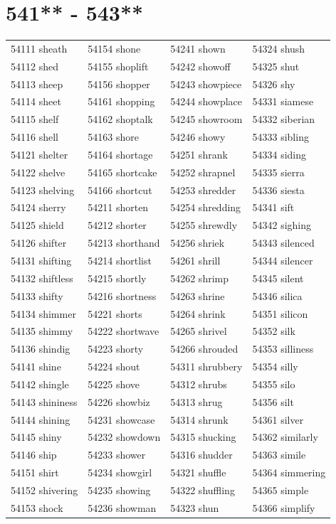 \documentclass[10pt, oneside]{book}
\begin{document}
\begin{table}
	\centering
	\section*{541** - 543**}
	\begin{tabular}{l l l l}
54111 sheath &54154 shone &54241 shown &54324 shush\\
54112 shed &54155 shoplift &54242 showoff &54325 shut\\
54113 sheep &54156 shopper &54243 showpiece &54326 shy\\
54114 sheet &54161 shopping &54244 showplace &54331 siamese\\
54115 shelf &54162 shoptalk &54245 showroom &54332 siberian\\
54116 shell &54163 shore &54246 showy &54333 sibling\\
54121 shelter &54164 shortage &54251 shrank &54334 siding\\
54122 shelve &54165 shortcake &54252 shrapnel &54335 sierra\\
54123 shelving &54166 shortcut &54253 shredder &54336 siesta\\
54124 sherry &54211 shorten &54254 shredding &54341 sift\\
54125 shield &54212 shorter &54255 shrewdly &54342 sighing\\
54126 shifter &54213 shorthand &54256 shriek &54343 silenced\\
54131 shifting &54214 shortlist &54261 shrill &54344 silencer\\
54132 shiftless &54215 shortly &54262 shrimp &54345 silent\\
54133 shifty &54216 shortness &54263 shrine &54346 silica\\
54134 shimmer &54221 shorts &54264 shrink &54351 silicon\\
54135 shimmy &54222 shortwave &54265 shrivel &54352 silk\\
54136 shindig &54223 shorty &54266 shrouded &54353 silliness\\
54141 shine &54224 shout &54311 shrubbery &54354 silly\\
54142 shingle &54225 shove &54312 shrubs &54355 silo\\
54143 shininess &54226 showbiz &54313 shrug &54356 silt\\
54144 shining &54231 showcase &54314 shrunk &54361 silver\\
54145 shiny &54232 showdown &54315 shucking &54362 similarly\\
54146 ship &54233 shower &54316 shudder &54363 simile\\
54151 shirt &54234 showgirl &54321 shuffle &54364 simmering\\
54152 shivering &54235 showing &54322 shuffling &54365 simple\\
54153 shock &54236 showman &54323 shun &54366 simplify\\
	\end{tabular}
 \end{table}
\clearpage
\end{document}
